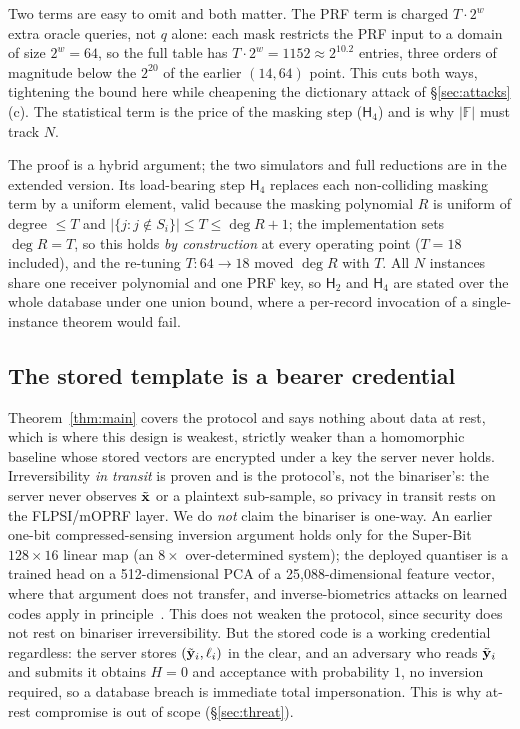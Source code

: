 Two terms are easy to omit and both matter. The PRF term is charged $T\cdot2^{w}$ extra oracle queries,
not $q$ alone: each mask restricts the PRF input to a domain of size $2^{w}=64$, so the full table has
$T\cdot2^{w}=1152 \approx 2^{10.2}$ entries, three orders of magnitude below the $2^{20}$ of the earlier
$(14,64)$ point. This cuts both ways, tightening the bound here while cheapening the dictionary attack
of \S\ref{sec:attacks}(c). The statistical term is the price of the masking step ($\mathsf{H}_4$) and is
why $|\mathbb{F}|$ must track $N$.

The proof is a hybrid argument; the two simulators and full reductions are in the extended version. Its
load-bearing step $\mathsf{H}_4$ replaces each non-colliding masking term by a uniform element, valid
because the masking polynomial $R$ is uniform of degree $\le T$ and $|\{j : j\notin S_i\}| \le T \le
\deg R + 1$; the implementation sets $\deg R = T$, so this holds \emph{by construction} at every
operating point ($T=18$ included), and the re-tuning $T:64\to18$ moved $\deg R$ with $T$. All $N$
instances share one receiver polynomial and one PRF key, so $\mathsf{H}_2$ and $\mathsf{H}_4$ are
stated over the whole database under one union bound, where a per-record invocation of a
single-instance theorem would fail.

\subsection{The stored template is a bearer credential}
\label{sec:atrest}

Theorem~\ref{thm:main} covers the protocol and says nothing about data at rest, which is where this
design is weakest, strictly weaker than a homomorphic baseline whose stored vectors are encrypted under
a key the server never holds. Irreversibility \emph{in transit} is proven and is the protocol's, not
the binariser's: the server never observes $\tilde{\mathbf{x}}$ or a plaintext sub-sample, so privacy in transit rests
on the FLPSI/mOPRF layer. We do \emph{not} claim the binariser is one-way. An earlier one-bit
compressed-sensing inversion argument holds only for the Super-Bit $128{\times}16$ linear map (an
$8\times$ over-determined system); the deployed quantiser is a trained head on a 512-dimensional PCA of
a 25{,}088-dimensional feature vector, where that argument does not transfer, and inverse-biometrics
attacks on learned codes apply in principle~\cite{GomezBarreroGalbally20}. This
does not weaken the protocol, since security does not rest on binariser irreversibility. But the stored
code is a working credential regardless: the server stores $(\tilde{\mathbf{y}}_i,\ell_i)$ in the clear, and an
adversary who reads $\tilde{\mathbf{y}}_i$ and submits it obtains $H=0$ and acceptance with probability $1$, no
inversion required, so a database breach is immediate total impersonation. This is why at-rest
compromise is out of scope (\S\ref{sec:threat}).

